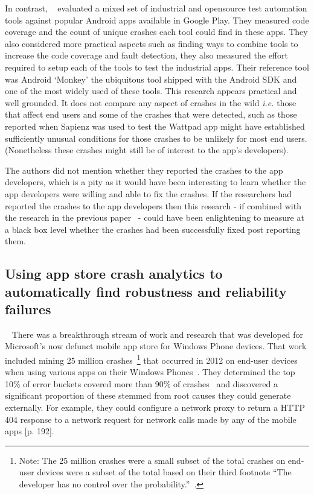 In contrast, ~ evaluated a mixed set of industrial and opensource test automation tools against popular Android apps available in Google Play. They measured code coverage and the count of unique crashes each tool could find in these apps. They also considered more practical aspects such as finding ways to combine tools to increase the code coverage and fault detection, they also measured the effort required to setup each of the tools to test the industrial apps. Their reference tool was Android `Monkey' the ubiquitous tool shipped with the Android SDK and one of the most widely used of these tools. This research appears practical and well grounded. It does not compare any aspect of crashes in the wild \emph{i.e.} those that affect end users and some of the crashes that were detected, such as those reported when Sapienz was used to test the Wattpad app might have established sufficiently unusual conditions for those crashes to be unlikely for most end users. (Nonetheless these crashes might still be of interest to the app's developers). 

The authors did not mention whether they reported the crashes to the app developers, which is a pity as it would have been interesting to learn whether the app developers were willing and able to fix the crashes. If the researchers had reported the crashes to the app developers then this research - if combined with the research in the previous paper~ - could have been enlightening to measure at a black box level whether the crashes had been successfully fixed post reporting them.

\subsection{Using app store crash analytics to automatically find robustness and reliability failures}~\label{rw-windows-phone-store-crash-analysis-section}
There was a breakthrough stream of work and research that was developed for Microsoft's now defunct mobile app store for Windows Phone devices. That work included mining 25 million crashes~\footnote{Note: The 25 million crashes were a small subset of the total crashes on end-user devices were a subset of the total based on their third footnote ``The developer has no control over the probability.''~\cite[p. 191]{ravindrath2014_automatic_and_scalable_fault_detection_for_mobile_apps}.} that occurred in 2012 on end-user devices when using various apps on their Windows Phones~\cite[p. 190]{ravindrath2014_automatic_and_scalable_fault_detection_for_mobile_apps}. They determined the top 10\% of error buckets covered more than 90\% of crashes~\cite[p. 192]{ravindrath2014_automatic_and_scalable_fault_detection_for_mobile_apps} and discovered a significant proportion of these stemmed from root causes they could generate externally. For example, they could configure a network proxy to return a HTTP 404 response to a network request for network calls made by any of the mobile apps [p. 192].


